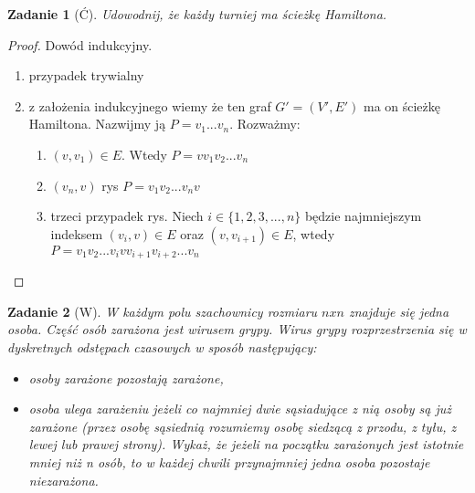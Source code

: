 \documentclass{mwbk}
\newtheorem{zad}{Zadanie}[chapter]
\begin{document}
\begin{zad}[Ć]
    Udowodnij, że każdy turniej ma ścieżkę Hamiltona.
\end{zad}
\begin{proof}
    Dowód indukcyjny.
    \begin{enumerate}
        \item przypadek trywialny
        \item z założenia indukcyjnego wiemy że ten graf $G' = (V', E')$ ma
              on ścieżkę Hamiltona. Nazwijmy ją $P = v_1 ... v_n$. Rozważmy:
              \begin{enumerate}
                  \item $(v, v_1) \in E$. Wtedy $P = v v_1 v_2 ... v_n$
                  \item $(v_n, v)$ rys $P = v_1 v_2 ... v_n v$
                  \item trzeci przypadek rys. Niech $i \in \{1, 2, 3, ..., n\}$
                        będzie najmniejszym indeksem $(v_i, v) \in E$ oraz $(v, v_{i+1}) \in E$,
                        wtedy $P = v_1 v_2 ... v_i v v_{i+1} v_{i+2} ... v_n$
              \end{enumerate}
    \end{enumerate}
\end{proof}





\begin{zad}[W]
    W każdym polu szachownicy rozmiaru $n x n $ znajduje się jedna osoba.
    Część osób zarażona jest wirusem grypy. Wirus grypy rozprzestrzenia się w dyskretnych
    odstępach czasowych w sposób następujący:
    \begin{itemize}
        \item osoby zarażone pozostają zarażone,
        \item osoba ulega zarażeniu jeżeli co najmniej dwie sąsiadujące z nią osoby są już zarażone
              (przez osobę sąsiednią rozumiemy osobę siedzącą z przodu, z tyłu, z lewej lub prawej
              strony).
              Wykaż, że jeżeli na początku zarażonych jest istotnie mniej niż n osób, to w każdej chwili
              przynajmniej jedna osoba pozostaje niezarażona.
    \end{itemize}
\end{zad}
\end{document}
